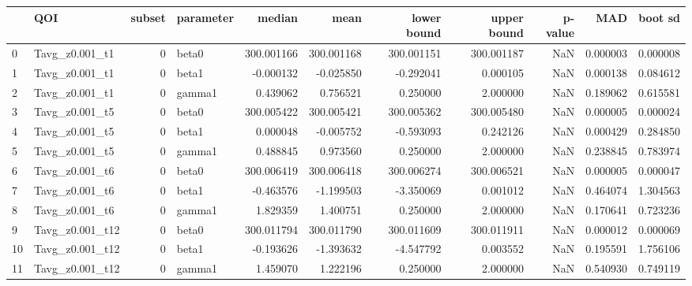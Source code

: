 \begin{tabular}{llrlrrrrrrr}
\toprule
{} &               QOI &  subset & parameter &        median &          mean &   lower bound &  upper bound &  p-value &           MAD &       boot sd \\
\midrule
0  &    Tavg_z0.001_t1 &       0 &     beta0 &    300.001166 &    300.001168 &    300.001151 &   300.001187 &      NaN &      0.000003 &      0.000008 \\
1  &    Tavg_z0.001_t1 &       0 &     beta1 &     -0.000132 &     -0.025850 &     -0.292041 &     0.000105 &      NaN &      0.000138 &      0.084612 \\
2  &    Tavg_z0.001_t1 &       0 &    gamma1 &      0.439062 &      0.756521 &      0.250000 &     2.000000 &      NaN &      0.189062 &      0.615581 \\
3  &    Tavg_z0.001_t5 &       0 &     beta0 &    300.005422 &    300.005421 &    300.005362 &   300.005480 &      NaN &      0.000005 &      0.000024 \\
4  &    Tavg_z0.001_t5 &       0 &     beta1 &      0.000048 &     -0.005752 &     -0.593093 &     0.242126 &      NaN &      0.000429 &      0.284850 \\
5  &    Tavg_z0.001_t5 &       0 &    gamma1 &      0.488845 &      0.973560 &      0.250000 &     2.000000 &      NaN &      0.238845 &      0.783974 \\
6  &    Tavg_z0.001_t6 &       0 &     beta0 &    300.006419 &    300.006418 &    300.006274 &   300.006521 &      NaN &      0.000005 &      0.000047 \\
7  &    Tavg_z0.001_t6 &       0 &     beta1 &     -0.463576 &     -1.199503 &     -3.350069 &     0.001012 &      NaN &      0.464074 &      1.304563 \\
8  &    Tavg_z0.001_t6 &       0 &    gamma1 &      1.829359 &      1.400751 &      0.250000 &     2.000000 &      NaN &      0.170641 &      0.723236 \\
9  &   Tavg_z0.001_t12 &       0 &     beta0 &    300.011794 &    300.011790 &    300.011609 &   300.011911 &      NaN &      0.000012 &      0.000069 \\
10 &   Tavg_z0.001_t12 &       0 &     beta1 &     -0.193626 &     -1.393632 &     -4.547792 &     0.003552 &      NaN &      0.195591 &      1.756106 \\
11 &   Tavg_z0.001_t12 &       0 &    gamma1 &      1.459070 &      1.222196 &      0.250000 &     2.000000 &      NaN &      0.540930 &      0.749119 \\

\end{tabular}
